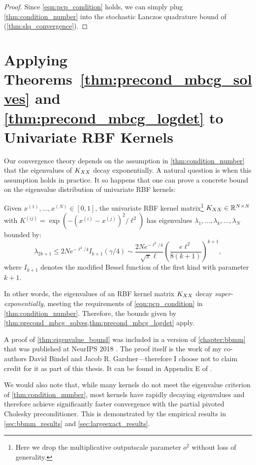\begin{proof}
Since \cref{eqn:pcp_condition} holds, we can simply plug \cref{thm:condition_number} into the stochastic Lanczos quadrature bound of \citet{ubaru2017fast} (\cref{thm:slq_convergence}).
\end{proof}









\section{Applying Theorems~\ref{thm:precond_mbcg_solves} and \ref{thm:precond_mbcg_logdet} to Univariate RBF Kernels}
\label{app:univariate_rbf}

Our convergence theory depends on the assumption in \cref{thm:condition_number} that the eigenvalues of $K_{XX}$ decay exponentially.
A natural question is when this assumption holds in practice.
It so happens that one can prove a concrete bound on the eigenvalue distribution of univariate RBF kernels:
%
\begin{lemma}
\label{thm:eigenvalue_bound}
Given $x^{(1)}, \ldots, x^{(N)} \in [0, 1]$, the univariate RBF kernel matrix\footnote{
  Here we drop the multiplicative outputscale parameter $o^2$ without loss of generality.
}
$K_{XX} \in \mathbb{R}^{N \times N}$ with $K^{(ij)} = \exp \left(-(x^{(i)} - x^{(j)})^{2} / \ell^2 \right)$ has eigenvalues $\lambda_1, \ldots, \lambda_k, \ldots, \lambda_N$ bounded by:
\begin{equation*}
  \lambda_{2k+1} \leq
  2N e^{-\ell^2/4} I_{k+1}(\gamma/4) \sim
  \frac{2N e^{-\ell^2/4}}{\sqrt{\pi}\ell}
  \left( \frac{e\ell^2}{8(k+1)} \right)^{k+1},
\end{equation*}
where $I_{k+1}$ denotes the modified Bessel function of the first kind with parameter $k + 1$.
\end{lemma}
%
\noindent
In other words, the eigenvalues of an RBF kernel matrix $K_{XX}$ decay \emph{super-exponentially}, meeting the requirements of \cref{eqn:pcp_condition} in \cref{thm:condition_number}.
Therefore, the bounds given by \cref{thm:precond_mbcg_solves,thm:precond_mbcg_logdet} apply.

A proof of \cref{thm:eigenvalue_bound} was included in a version of \cref{chapter:bbmm} that was published at NeurIPS 2018 \citep{gardner2018gpytorch}.
The proof itself is the work of my co-authors David Bindel and Jacob R. Gardner---therefore I choose not to claim credit for it as part of this thesis.
It can be found in Appendix E of \citep{gardner2018gpytorch}.

We would also note that, while many kernels do not meet the eigenvalue criterion of \cref{thm:condition_number}, most kernels have rapidly decaying eigenvalues and therefore achieve significantly faster convergence with the partial pivoted Cholesky preconditioner.
This is demonstrated by the empirical results in \cref{sec:bbmm_results} and \cref{sec:largeexact_results}.
